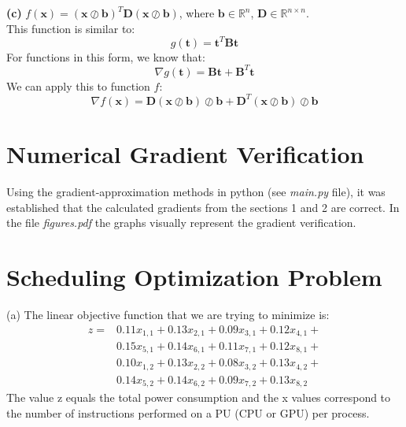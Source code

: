 \documentclass{article}
\begin{document}
\textbf{(c)} $f(\textbf{x}) = (\textbf{x}\oslash\textbf{b})^T\textbf{D}(\textbf{x}\oslash\textbf{b})$, where $\textbf{b} \in\mathbb{R}^n$, $\textbf{D} \in\mathbb{R}^{n\times n}$.\\
This function is similar to:
\begin{equation*}
    g(\textbf{t}) = \textbf{t}^T\textbf{B}\textbf{t} 
\end{equation*}
For functions in this form, we know that:
\begin{equation*}
    \nabla g(\textbf{t}) = \textbf{B}\textbf{t} + \textbf{B}^T\textbf{t}
\end{equation*}
We can apply this to function $f$:
\begin{equation*}
    \nabla f(\textbf{x}) = \textbf{D}(\textbf{x}\oslash\textbf{b})\oslash\textbf{b} + \textbf{D}^T(\textbf{x}\oslash\textbf{b})\oslash\textbf{b}
\end{equation*}

\section{Numerical Gradient Verification}
Using the gradient-approximation methods in python (see \textit{main.py} file), it was established that the calculated gradients from the sections 1 and 2 are correct. In the file \textit{figures.pdf} the graphs visually represent the gradient verification.

\section{Scheduling Optimization Problem}
(a) The linear objective function that we are trying to minimize is:
\begin{equation}
\label{tpc}
\begin{split}
    z = &0.11x_{1,1} + 0.13x_{2,1} + 0.09x_{3,1} + 0.12x_{4,1} + \\
    &0.15x_{5,1} + 0.14x_{6,1} + 0.11x_{7,1} + 0.12x_{8,1} + \\ 
    &0.10x_{1,2} + 0.13x_{2,2} + 0.08x_{3,2} + 0.13x_{4,2} + \\
    &0.14x_{5,2} + 0.14x_{6,2} + 0.09x_{7,2} + 0.13x_{8,2}
\end{split}
\end{equation}
The value z equals the total power consumption and the x values correspond to the number of instructions performed on a PU (CPU or GPU) per process.\\
\end{document}
